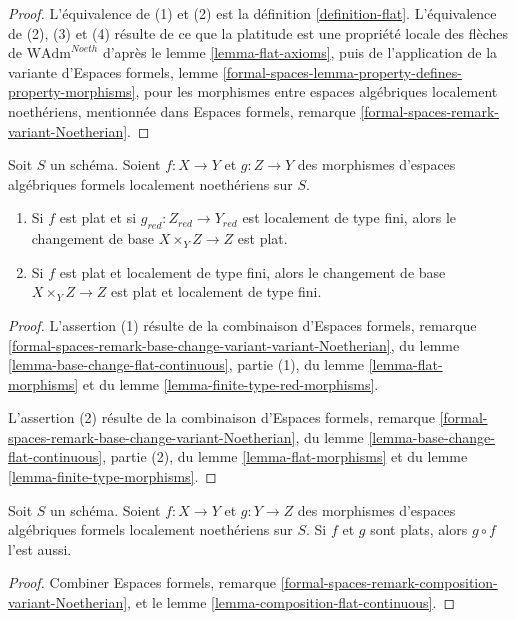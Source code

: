 \begin{proof}
L'équivalence de (1) et (2) est la définition \ref{definition-flat}.
L'équivalence de (2), (3) et (4) résulte de ce que la platitude est une
propriété locale des flèches de $\text{WAdm}^{Noeth}$ d'après le lemme
\ref{lemma-flat-axioms}, puis de l'application de la variante d'Espaces
formels, lemme \ref{formal-spaces-lemma-property-defines-property-morphisms},
pour les morphismes entre espaces algébriques localement noethériens,
mentionnée dans Espaces formels, remarque
\ref{formal-spaces-remark-variant-Noetherian}.
\end{proof}

\begin{lemma}
\label{lemma-base-change-flat}
Soit $S$ un schéma. Soient $f : X \to Y$ et $g : Z \to Y$ des morphismes
d'espaces algébriques formels localement noethériens sur $S$.
\begin{enumerate}
\item Si $f$ est plat et si $g_{red} : Z_{red} \to Y_{red}$ est localement
de type fini, alors le changement de base $X \times_Y Z \to Z$ est plat.
\item Si $f$ est plat et localement de type fini, alors le changement de
base $X \times_Y Z \to Z$ est plat et localement de type fini.
\end{enumerate}
\end{lemma}

\begin{proof}
L'assertion (1) résulte de la combinaison d'Espaces formels, remarque
\ref{formal-spaces-remark-base-change-variant-variant-Noetherian}, du
lemme \ref{lemma-base-change-flat-continuous}, partie (1), du lemme
\ref{lemma-flat-morphisms} et du lemme
\ref{lemma-finite-type-red-morphisms}.

\medskip\noindent
L'assertion (2) résulte de la combinaison d'Espaces formels, remarque
\ref{formal-spaces-remark-base-change-variant-Noetherian}, du lemme
\ref{lemma-base-change-flat-continuous}, partie (2), du lemme
\ref{lemma-flat-morphisms} et du lemme \ref{lemma-finite-type-morphisms}.
\end{proof}

\begin{lemma}
\label{lemma-composition-flat}
Soit $S$ un schéma. Soient $f : X \to Y$ et $g : Y \to Z$ des morphismes
d'espaces algébriques formels localement noethériens sur $S$. Si $f$ et
$g$ sont plats, alors $g \circ f$ l'est aussi.
\end{lemma}

\begin{proof}
Combiner Espaces formels, remarque
\ref{formal-spaces-remark-composition-variant-Noetherian}, et le lemme
\ref{lemma-composition-flat-continuous}.
\end{proof}

